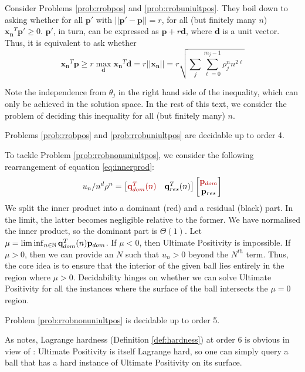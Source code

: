 Consider Problems \ref{prob:rrobpos} and \ref{prob:rrobuniultpos}. They boil down to asking whether for all $\mathbf{p'}$ with $||\mathbf{p'} - \mathbf{p}|| = r$, for all (but finitely many $n$) $\mathbf{x_n}^T\mathbf{p'} \ge 0$. $\mathbf{p'}$, in turn, can be expressed as $\mathbf{p} + r\mathbf{d}$, where $\mathbf{d}$ is a unit vector. Thus, it is equivalent to ask whether
\begin{equation}
\label{eq:crux}
\mathbf{x_n}^T\mathbf{p} \ge r\max_{\mathbf{d}}\mathbf{x_n}^T\mathbf{d} = r ||\mathbf{x_n}|| = r \sqrt{\sum_{j} \sum_{\ell=0}^{m_j-1} \rho_j^n n^{2\ell}}
\end{equation}

Note the independence from $\theta_j$ in the right hand side of the inequality, which can only be achieved in the solution space. In the rest of this text, we consider the problem of deciding this inequality for all (but finitely many) $n$.

\begin{theorem}
\label{thm:decide}
Problems \ref{prob:rrobpos} and \ref{prob:rrobuniultpos} are decidable up to order 4.
\end{theorem}

To tackle Problem \ref{prob:rrobnonuniultpos}, we consider the following rearrangement of equation \ref{eq:innerprod}:
\begin{equation}
\label{eq:grouping}
u_n/n^d\rho^n = \begin{bmatrix}
{\color{red!70!black} \mathbf{q}_{dom}^T(n) } & \mathbf{q}_{res}^T(n)
\end{bmatrix}
\begin{bmatrix}
{\color{red!70!black} \mathbf{p}_{dom}} \\
\mathbf{p}_{res}
\end{bmatrix}
\end{equation}
We split the inner product into a dominant ({\color{red!70!black}red}) and a residual (black) part. In the limit, the latter becomes negligible relative to the former. We have normalised the inner product, so the dominant part is $\Theta(1)$. Let $\mu = \liminf_{n\in \mathbb{N}}\mathbf{q}_{dom}^T(n)\mathbf{p}_{dom}$. If $\mu < 0$, then Ultimate Positivity is impossible. If $\mu > 0$, then we can provide an $N$ such that $u_n > 0$ beyond the $N^{th}$ term. Thus, the core idea is to ensure that the interior of the given ball lies entirely in the region where $\mu > 0$. Decidability hinges on whether we can solve Ultimate Positivity for all the instances where the surface of the ball intersects the $\mu = 0$ region.

\begin{theorem}
\label{thm:decide2}
Problem \ref{prob:rrobnonuniultpos} is decidable up to order 5.
\end{theorem}

As \cite{originalarxiv} notes, Lagrange hardness (Definition \ref{def:hardness}) at order 6 is obvious in view of \cite{joeljames3}: Ultimate Positivity is itself Lagrange hard, so one can simply query a ball that has a hard instance of Ultimate Positivity on its surface.

